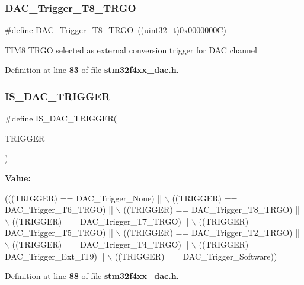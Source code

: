 \subsubsection{D\+A\+C\+\_\+\+Trigger\+\_\+\+T8\+\_\+\+T\+R\+GO}
{\footnotesize\ttfamily \#define D\+A\+C\+\_\+\+Trigger\+\_\+\+T8\+\_\+\+T\+R\+GO~((uint32\+\_\+t)0x0000000\+C)}

T\+I\+M8 T\+R\+GO selected as external conversion trigger for D\+AC channel 

Definition at line \textbf{ 83} of file \textbf{ stm32f4xx\+\_\+dac.\+h}.

\mbox{\label{group__DAC__trigger__selection_ga4409b79639e6ae3b1f0ed61a33c810a3}} 
\subsubsection{I\+S\+\_\+\+D\+A\+C\+\_\+\+T\+R\+I\+G\+G\+ER}
{\footnotesize\ttfamily \#define I\+S\+\_\+\+D\+A\+C\+\_\+\+T\+R\+I\+G\+G\+ER(\begin{DoxyParamCaption}\item[{}]{T\+R\+I\+G\+G\+ER }\end{DoxyParamCaption})}

{\bfseries Value\+:}
\begin{DoxyCode}
(((TRIGGER) == DAC_Trigger_None) || \(\backslash\)
                                 ((TRIGGER) == DAC_Trigger_T6_TRGO) || \(\backslash\)
                                 ((TRIGGER) == DAC_Trigger_T8_TRGO) || \(\backslash\)
                                 ((TRIGGER) == DAC_Trigger_T7_TRGO) || \(\backslash\)
                                 ((TRIGGER) == DAC_Trigger_T5_TRGO) || \(\backslash\)
                                 ((TRIGGER) == DAC_Trigger_T2_TRGO) || \(\backslash\)
                                 ((TRIGGER) == DAC_Trigger_T4_TRGO) || \(\backslash\)
                                 ((TRIGGER) == DAC_Trigger_Ext_IT9) || \(\backslash\)
                                 ((TRIGGER) == DAC_Trigger_Software))
\end{DoxyCode}


Definition at line \textbf{ 88} of file \textbf{ stm32f4xx\+\_\+dac.\+h}.

